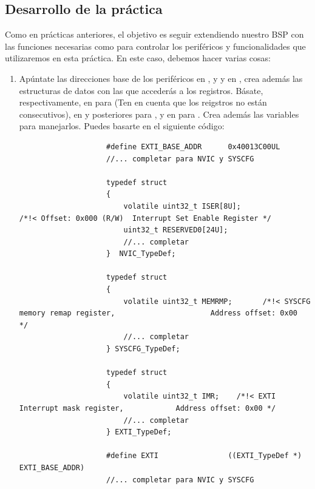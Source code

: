 \documentclass[../main.tex]{subfiles}
\begin{document}
    \subsection{Desarrollo de la práctica}

        Como en prácticas anteriores, el objetivo es seguir extendiendo nuestro BSP con las funciones necesarias como para controlar los periféricos y funcionalidades que utilizaremos en esta práctica. En este caso, debemos hacer varias cosas:

        \begin{enumerate}
            \item Apúntate las direcciones base de los periféricos  en \PMMAN[4.2], y  y  en \REFMAN[1.6.2], crea además las estructuras de datos con las que accederás a los registros. Básate, respectivamente, en \PMMAN[4.2] para  (Ten en cuenta que los reigstros no están consecutivos), en \REFMAN[10.7] y posteriores para , y en \REFMAN[7.2.8] para . Crea además las variables para manejarlos. Puedes basarte en el siguiente código:
            

                \begin{lstlisting}
                    #define EXTI_BASE_ADDR 		0x40013C00UL
                    //... completar para NVIC y SYSCFG

                    typedef struct
                    {
                        volatile uint32_t ISER[8U];               /*!< Offset: 0x000 (R/W)  Interrupt Set Enable Register */
                        uint32_t RESERVED0[24U];
                        //... completar
                    }  NVIC_TypeDef;

                    typedef struct
                    {
                        volatile uint32_t MEMRMP;       /*!< SYSCFG memory remap register,                      Address offset: 0x00      */
                        //... completar
                    } SYSCFG_TypeDef;

                    typedef struct
                    {
                        volatile uint32_t IMR;    /*!< EXTI Interrupt mask register,            Address offset: 0x00 */
                        //... completar
                    } EXTI_TypeDef;

                    #define EXTI                ((EXTI_TypeDef *) EXTI_BASE_ADDR)
                    //... completar para NVIC y SYSCFG
                \end{lstlisting}


\end{enumerate}
\end{document}
